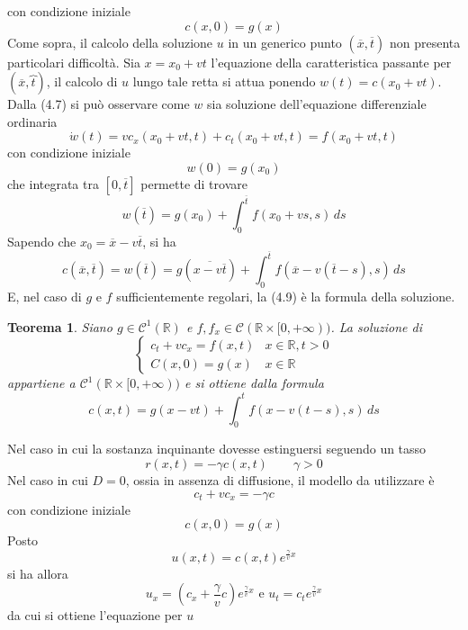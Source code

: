 \documentclass[a4paper,12pt, draft]{article}
\theoremstyle{break}
\newtheorem{theorem}{Teorema}[section]
\numberwithin{equation}{section}
\begin{document}
con condizione iniziale 
\begin{equation}
  c(x, 0) = g(x)
\end{equation}
Come sopra, il calcolo della soluzione \(u\) in un generico punto \((\overline{x}, \overline{t})\) non presenta particolari difficoltà. Sia \(x = x_0 + vt\) l'equazione della caratteristica passante per \((\overline{x}, \overbrace{t})\), il calcolo di \(u\) lungo tale retta si attua ponendo \(w(t) = c(x_0 + vt)\). Dalla (4.7) si può osservare come \(w\) sia soluzione dell'equazione differenziale ordinaria 
\[
\dot{w}(t) = vc_x(x_0 + vt, t) + c_t(x_0 + vt, t) = f(x_0 + vt, t) 
\]
con condizione iniziale 
\[
  w(0) = g(x_0)
\]
che integrata tra \([0, \overline{t}]\) permette di trovare
\[
  w(\overline{t}) = g(x_0) + \int_0^{\overline{t}} f(x_0 +vs,s) \, ds  
\]
Sapendo che \(x_0 = \overline{x} - v\overline{t}\), si ha 
\begin{equation}
  c(\overline{x}, \overline{t}) = w(\overline{t}) = g(\overline{x - v\overline{t}}) + \int_0^{\overline{t}} f(\overline{x} - v(\overline{t} -s), s) \, ds
\end{equation}
E, nel caso di \(g \mbox{ e } f\) sufficientemente regolari, la (4.9) è la formula della soluzione.
\begin{theorem}
  Siano \(g \in \mathcal{C}^1 (\mathbb{R})\) e \(f, f_x \in \mathcal{C}(\mathbb{R} \times [0, +\infty))\). La soluzione di 
  \[
    \begin{cases}
      c_t + vc_x = f(x,t) & x \in \mathbb{R}, t > 0 \\
      C(x, 0) = g(x) & x \in \mathbb{R}
    \end{cases}
\]
appartiene a \(\mathcal{C}^1(\mathbb{R} \times [0, +\infty))\) e si ottiene dalla formula
\begin{equation}
  c(x,t) = g(x -vt) + \int_0^t f(x-v(t-s), s) \, ds
\end{equation}
\end{theorem}
Nel caso in cui la sostanza inquinante dovesse estinguersi seguendo un tasso
\[
  r(x, t) = -\gamma c(x,t) \qquad \gamma > 0
\]
Nel caso in cui \(D = 0\), ossia in assenza di diffusione, il modello da utilizzare è 
\[
c_t + vc_x = -\gamma c  
\]
con condizione iniziale
\[
  c(x, 0) = g(x)
\]
Posto 
\begin{equation}
  u(x,t) = c(x,t)e^{\frac{\gamma}{v} x}
\end{equation}
si ha allora
\[
u_x = \left(c_x + \frac{\gamma}{v} c\right)e^{\frac{\gamma}{v} x} \mbox{ e } u_t = c_t e^{\frac{\gamma}{v} x}
\]
da cui si ottiene l'equazione per \(u\) 
\end{document}
